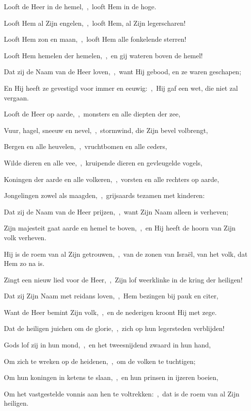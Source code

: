 \documentclass[12pt,twoside,a5paper]{article}
\begin{document}
\begin{halfparskip}
  Looft de Heer in de hemel,~\sep\ looft Hem in de hoge.


  Looft Hem al Zijn engelen,~\sep\ looft Hem, al Zijn legerscharen!

  Looft Hem zon en maan,~\sep\ looft Hem alle fonkelende sterren!

  Looft Hem hemelen der hemelen,~\sep\ en gij wateren boven de hemel!

  Dat zij de Naam van de Heer loven,~\sep\ want Hij gebood, en ze waren geschapen;

  En Hij heeft ze gevestigd voor immer en eeuwig:~\sep\ Hij gaf een wet, die niet zal vergaan.

  Looft de Heer op aarde,~\sep\ monsters en alle diepten der zee,

  Vuur, hagel, sneeuw en nevel,~\sep\ stormwind, die Zijn bevel volbrengt,

  Bergen en alle heuvelen,~\sep\ vruchtbomen en alle ceders,

  Wilde dieren en alle vee,~\sep\ kruipende dieren en gevleugelde vogels,

  Koningen der aarde en alle volkeren,~\sep\ vorsten en alle rechters op aarde,

  Jongelingen zowel als maagden,~\sep\ grijsaards tezamen met kinderen:

  Dat zij de Naam van de Heer prijzen,~\sep\ want Zijn Naam alleen is verheven;

  Zijn majesteit gaat aarde en hemel te boven,~\sep\ en Hij heeft de hoorn van Zijn volk verheven.

  Hij is de roem van al Zijn getrouwen,~\sep\ van de zonen van Israël, van het volk, dat Hem zo na is.
\end{halfparskip}


\begin{halfparskip}
  Zingt een nieuw lied voor de Heer,~\sep\ Zijn lof weerklinke in de kring der heiligen!


  Dat zij Zijn Naam met reidans loven,~\sep\ Hem bezingen bij pauk en citer,

  Want de Heer bemint Zijn volk,~\sep\ en de nederigen kroont Hij met zege.

  Dat de heiligen juichen om de glorie,~\sep\ zich op hun legersteden verblijden!

  Gods lof zij in hun mond,~\sep\ en het tweesnijdend zwaard in hun hand,

  Om zich te wreken op de heidenen,~\sep\ om de volken te tuchtigen;

  Om hun koningen in ketens te slaan,~\sep\ en hun prinsen in ijzeren boeien,

  Om het vastgestelde vonnis aan hen te voltrekken:~\sep\ dat is de roem van al Zijn heiligen.
\end{halfparskip}
\end{document}
